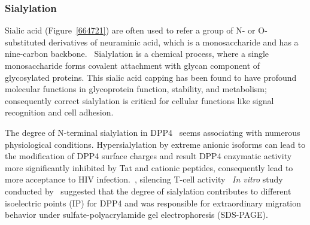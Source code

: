 \subsubsection {Sialylation}
Sialic acid (Figure~\ref{664721}) are often used to refer a group of N- or O-substituted derivatives of neuraminic acid, which is a monosaccharide and has a nine-carbon backbone.~\cite{Vocadlo_2009} Sialylation is a chemical process, where a single monosaccharide forms covalent attachment with glycan component of glycosylated proteins. This sialic acid capping has been found to have profound molecular functions in glycoprotein function, stability, and metabolism; consequently correct sialylation is critical for cellular functions like signal recognition and cell adhesion.~\cite{Bhide_2016}
\par 
The degree of N-terminal sialylation in DPP4~\cite{Stehling_1999} seems associating with numerous physiological conditions. Hypersialylation by extreme anionic isoforms can lead to the modification of DPP4 surface charges and result DPP4 enzymatic activity more significantly inhibited by Tat and cationic peptides, consequently lead to more acceptance to HIV infection.~\cite{SMITH_1998},
silencing T-cell activity~\cite{K_hne_1996} 
\textit{In vitro} study conducted by~\citet{Schmauser1999} suggested that the degree of sialylation contributes to different isoelectric points (IP) for DPP4 and was responsible for extraordinary migration behavior under sulfate-polyacrylamide gel electrophoresis (SDS-PAGE).